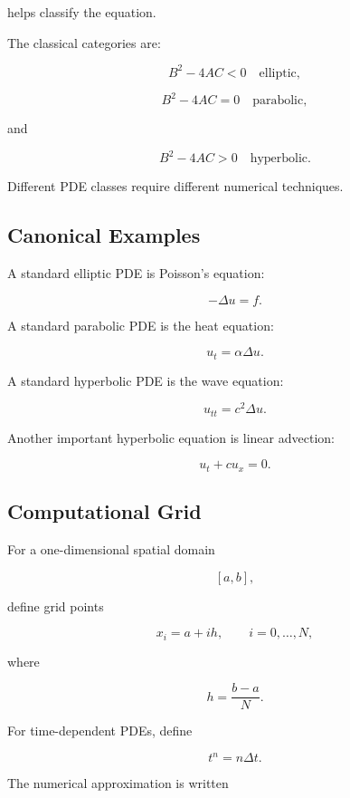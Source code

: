 helps classify the equation.

The classical categories are:

\[
\boxed{
B^2-4AC<0
\quad
\text{elliptic},
}
\]

\[
\boxed{
B^2-4AC=0
\quad
\text{parabolic},
}
\]

and

\[
\boxed{
B^2-4AC>0
\quad
\text{hyperbolic}.
}
\]

Different PDE classes require different numerical techniques.

\subsection{Canonical Examples}
\label{subsec:pde-canonical-examples}

A standard elliptic PDE is Poisson's equation:

\[
\boxed{
-\Delta u=f.
}
\]

A standard parabolic PDE is the heat equation:

\[
\boxed{
u_t=\alpha\Delta u.
}
\]

A standard hyperbolic PDE is the wave equation:

\[
\boxed{
u_{tt}=c^2\Delta u.
}
\]

Another important hyperbolic equation is linear advection:

\[
\boxed{
u_t+cu_x=0.
}
\]

\subsection{Computational Grid}
\label{subsec:pde-computational-grid}

For a one-dimensional spatial domain

\[
[a,b],
\]

define grid points

\[
\boxed{
x_i=a+ih,
\qquad
i=0,\ldots,N,
}
\]

where

\[
\boxed{
h=\frac{b-a}{N}.
}
\]

For time-dependent PDEs, define

\[
\boxed{
t^n=n\Delta t.
}
\]

The numerical approximation is written

